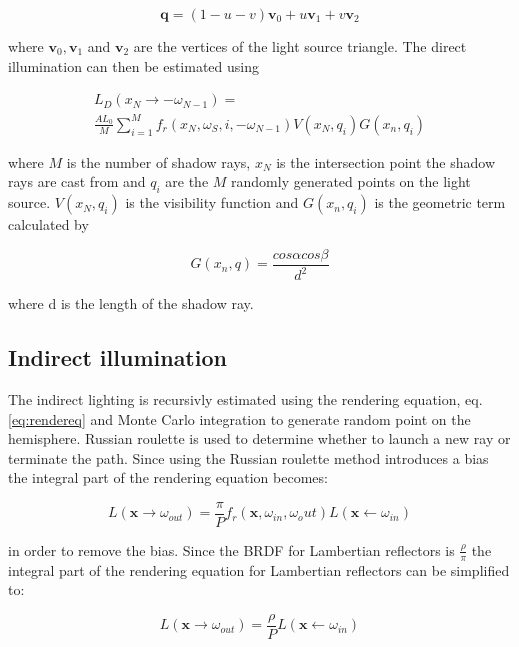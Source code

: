 \documentclass[twocolumn]{article}
\begin{document}
\begin{equation*}
	\mathbf{q} = (1 - u - v)\mathbf{v}_0 + u\mathbf{v}_1 + v\mathbf{v}_2
\end{equation*}

where $\mathbf{v}_0, \mathbf{v}_1$ and $\mathbf{v}_2$ are the vertices of the light source triangle. The direct illumination can then be estimated using

\begin{align*}
	L_D(x_N \rightarrow -\omega_{N-1}) = \\
	 \frac{AL_0}{M} \sum_{i=1}^{M}f_r(x_N, \omega_S, i, -\omega_{N-1})V(x_N, q_i)G(x_n, q_i)
\end{align*}

where $M$ is the number of shadow rays, $x_N$ is the intersection point the shadow rays are cast from and $q_i$ are the $M$ randomly generated points on the light source. $V(x_N, q_i)$ is the visibility function and $G(x_n, q_i)$ is the geometric term calculated by 

\begin{equation*}
	G(x_n, q) = \frac{cos\alpha cos\beta}{d^2}
\end{equation*}

where d is the length of the shadow ray.

\subsection{Indirect illumination}
The indirect lighting is recursivly estimated using the rendering equation, eq. \ref{eq:rendereq} and Monte Carlo integration to generate random point on the hemisphere. Russian roulette is used to determine whether to launch a new ray or terminate the path. Since using the Russian roulette method introduces a bias the integral part of the rendering equation becomes:

\begin{equation*}
	L(\mathbf{x}\rightarrow\omega_{out}) = \frac{\pi}{P}f_r(\mathbf{x}, \omega_{in}, \omega_out)L(\mathbf{x}\leftarrow\omega_{in})
\end{equation*}

in order to remove the bias. Since the BRDF for Lambertian reflectors is $\frac{\rho}{\pi}$ the integral part of the rendering equation for Lambertian reflectors can be simplified to:

\begin{equation*}
	L(\mathbf{x}\rightarrow\omega_{out}) = \frac{\rho}{P}L(\mathbf{x}\leftarrow\omega_{in})
\end{equation*}
\end{document}
